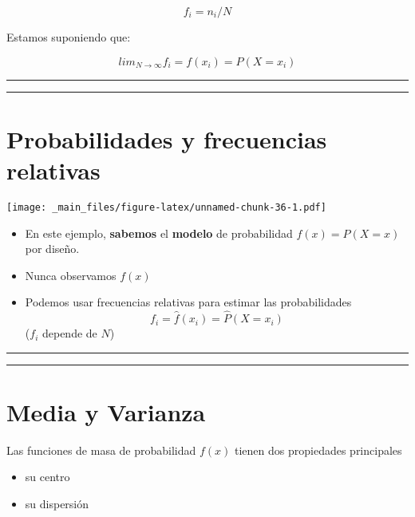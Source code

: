 \documentclass[
]{book}
\providecommand{\tightlist}{%
  \setlength{\itemsep}{0pt}\setlength{\parskip}{0pt}}
\begin{document}
\[f_i=n_i/N\]

Estamos suponiendo que:

\[lim_{N \rightarrow \infty} f_i = f(x_i)=P(X=x_i)\]

\begin{center}\rule{0.5\linewidth}{0.5pt}\end{center}

\begin{center}\rule{0.5\linewidth}{0.5pt}\end{center}

\hypertarget{probabilidades-y-frecuencias-relativas}{%
\section{Probabilidades y frecuencias relativas}\label{probabilidades-y-frecuencias-relativas}}

\texttt{[image: \_main\_files/figure-latex/unnamed-chunk-36-1.pdf]}

\begin{itemize}
\tightlist
\item
  En este ejemplo, \textbf{sabemos} el \textbf{modelo} de probabilidad \(f(x)=P(X=x)\) por diseño.
\item
  Nunca observamos \(f(x)\)
\item
  Podemos usar frecuencias relativas para estimar las probabilidades
  \[f_i = \hat{f}(x_i)=\hat{P}(X=x_i)\] (\(f_i\) depende de \(N\))
\end{itemize}

\begin{center}\rule{0.5\linewidth}{0.5pt}\end{center}

\begin{center}\rule{0.5\linewidth}{0.5pt}\end{center}

\hypertarget{media-y-varianza}{%
\section{Media y Varianza}\label{media-y-varianza}}

Las funciones de masa de probabilidad \(f(x)\) tienen dos propiedades principales

\begin{itemize}
\tightlist
\item
  su centro
\item
  su dispersión
\end{itemize}
\end{document}
